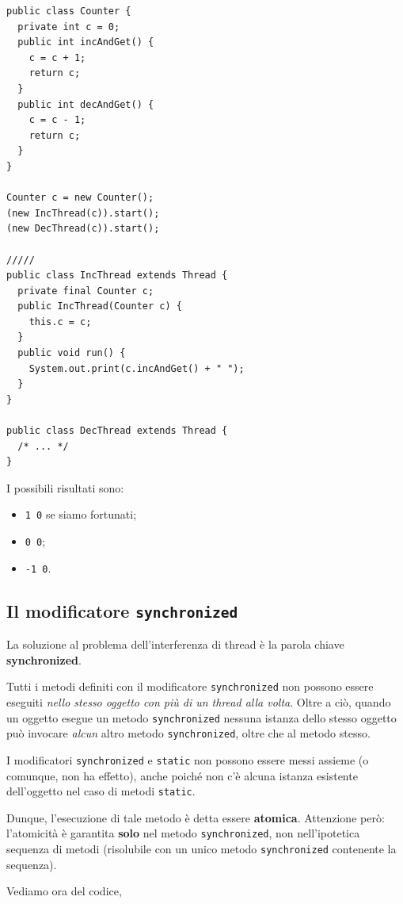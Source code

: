 \documentclass[\fontsizeclass,twocolumn]{\classname}
\theoremstyle{definition}
\theoremstyle{definition}
\begin{document}
\begin{lstlisting}
public class Counter {
  private int c = 0;
  public int incAndGet() {
    c = c + 1;
    return c;
  }
  public int decAndGet() {
    c = c - 1;
    return c;
  }
}

Counter c = new Counter();
(new IncThread(c)).start();
(new DecThread(c)).start();

/////
public class IncThread extends Thread {
  private final Counter c;
  public IncThread(Counter c) {
    this.c = c;
  }
  public void run() {
    System.out.print(c.incAndGet() + " ");
  }
}

public class DecThread extends Thread {
  /* ... */
}

\end{lstlisting}

I possibili risultati sono:
\begin{itemize}
    \item \texttt{1 0} se siamo fortunati;
    \item \texttt{0 0};
    \item \texttt{-1 0}.
\end{itemize}

\subsection{Il modificatore \texttt{synchronized}}

La soluzione al problema dell'interferenza di thread è la parola chiave
\textbf{synchronized}.

Tutti i metodi definiti con il modificatore \texttt{synchronized} non possono
essere eseguiti \emph{nello stesso oggetto con più di un thread alla volta}.
Oltre a ciò, quando un oggetto esegue un metodo \texttt{synchronized} nessuna
istanza dello stesso oggetto può invocare \emph{alcun} altro metodo
\texttt{synchronized}, oltre che al metodo stesso.

I modificatori \texttt{synchronized} e \texttt{static} non possono essere messi
assieme (o comunque, non ha effetto), anche poiché non c'è alcuna istanza
esistente dell'oggetto nel caso di metodi \texttt{static}.

Dunque, l'esecuzione di tale metodo è detta essere \textbf{atomica}. Attenzione
però: l'atomicità è garantita \textbf{solo} nel metodo \texttt{synchronized},
non nell'ipotetica sequenza di metodi (risolubile con un unico metodo
\texttt{synchronized} contenente la sequenza).

Vediamo ora del codice,
\end{document}
